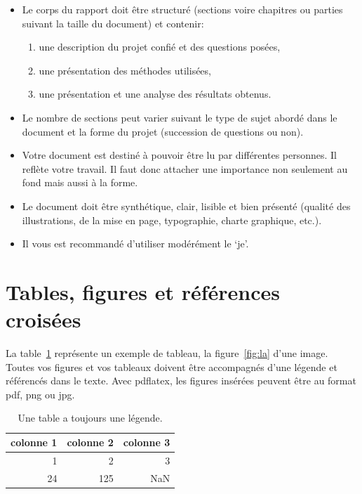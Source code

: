 \documentclass{ipgplicence}
\begin{document}
\begin{itemize}

\item Le corps du rapport doit être structuré (sections voire chapitres ou parties suivant la taille du document) et  contenir: 
\begin{enumerate}
\item une description du projet confié et des questions posées,
\item une présentation des méthodes utilisées,
\item une présentation et une analyse des résultats obtenus.
\end{enumerate}

\item Le nombre de sections peut varier suivant le type de sujet abordé dans le document et la forme du projet (succession de questions ou non).

\item Votre document est destiné à pouvoir être lu par différentes personnes. Il reflète votre travail. Il faut donc attacher une importance non seulement au fond mais aussi à la forme.

\item Le document doit être synthétique, clair, lisible et bien présenté (qualité des illustrations, de la mise en page, typographie, charte graphique, etc.). 

\item Il vous est recommandé d’utiliser modérément le ‘je’. 
\end{itemize}


	\section{Tables, figures et références croisées}

La table~\ref{tab:ici} représente un exemple de tableau, la figure~\ref{fig:la} d'une image. Toutes vos figures et vos tableaux doivent être accompagnés d'une légende et référencés dans le texte. Avec pdflatex, les figures insérées peuvent être au format pdf, png ou jpg.

\begin{table}[htb]
\caption{Une table a toujours une légende.}
\label{tab:ici} %
\begin{center}
\begin{tabular}{rrr} \toprule
colonne 1 & colonne 2 & colonne 3 \\ \midrule
1 & 2 & 3 \\
24 & 125 & NaN \\ \bottomrule
\end{tabular}
\end{center}
\end{table}
\end{document}
